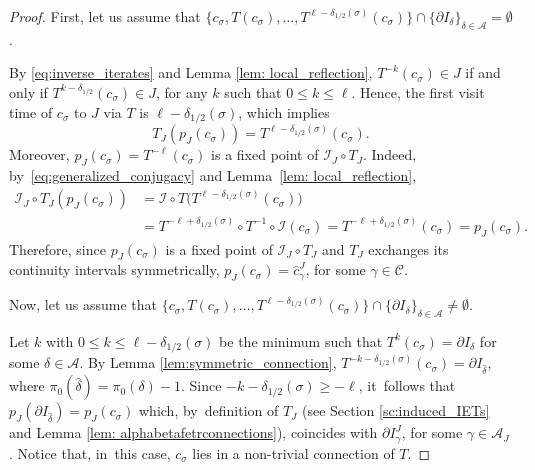 \documentclass[10pt,a4paper]{article}
\theoremstyle{plain}
\theoremstyle{definition}
\newcommand{\A}{\mathcal{A}}
\newcommand{\I}{\mathcal{I}}
\begin{document}
\begin{proof}
First, let us assume that $\{c_\sigma, T(c_\sigma), \ldots, T^{\ell - \delta_{1/2}(\sigma)}(c_\sigma)\} \cap \{\partial I_\delta\}_{\delta \in \A} = \emptyset$.

By \eqref{eq:inverse_iterates} and Lemma \ref{lem: local_reflection},
$T^{-k}(c_\sigma) \in J$ if and only if $T^{k - \delta_{1/2}}(c_\sigma) \in J$,
for any $k$ such that $0 \leq k \leq \ell$. Hence, the first visit time of $c_\sigma$ to $J$
via $T$ is $\ell - \delta_{1/2}(\sigma)$, which implies
\[
T_J(p_J(c_\sigma)) = T^{\ell - \delta_{1/2}(\sigma)}(c_\sigma).
\]
Moreover, $p_J(c_\sigma) = T^{-\ell}(c_\sigma)$ is a fixed point of $\I_J \circ T_J$. Indeed, by~\eqref{eq:generalized_conjugacy} and Lemma~\ref{lem: local_reflection},
\begin{align*}
\I_J \circ T_J(p_J(c_\sigma)) &= \I \circ T \big( T^{\ell -
\delta_{1/2}(\sigma)}(c_\sigma) \big) \\
&= T^{-\ell + \delta_{1/2}(\sigma)}\circ
T^{-1} \circ \I (c_\sigma) = T^{-\ell + \delta_{1/2}(\sigma)} (c_\sigma) =
p_J(c_\sigma).
\end{align*}
Therefore, since $p_J(c_\sigma)$ is a fixed point of $\I_J \circ T_J$ and $T_J$ exchanges its continuity intervals symmetrically, $p_J(c_\sigma) = \hat c_\gamma^J$, for some $\gamma \in \mathcal C$.

Now, let us assume that $\{c_\sigma, T(c_\sigma), \ldots, T^{\ell - \delta_{1/2}(\sigma)}(c_\sigma)\} \cap \{\partial I_\delta\}_{\delta \in \A} \neq \emptyset$.

Let $k$ with $0 \leq k \leq \ell - \delta_{1/2}(\sigma)$ be the minimum such that $T^k(c_\sigma) = \partial I _\delta$ for some $\delta \in \A$. By Lemma \ref{lem:symmetric_connection}, $T^{-k - \delta_{1/2}(\sigma)}(c_\sigma) = \partial I_{\hat \delta}$, where $\pi_0(\hat \delta) = \pi_0(\delta) - 1$. Since $-k - \delta_{1/2}(\sigma) \geq -\ell$, it~follows that $p_J(\partial I_{\hat \delta}) = p_J(c_\sigma)$ which, by~definition of $T_J$ (see Section \ref{sc:induced_IETs} and Lemma \ref{lem: alphabetafetrconnections}), coincides with $\partial I_\gamma^J$, for some $\gamma \in \A_J$. Notice that, in~this case, $c_\sigma$ lies in a non-trivial connection of $T$.
\end{proof}
\end{document}
